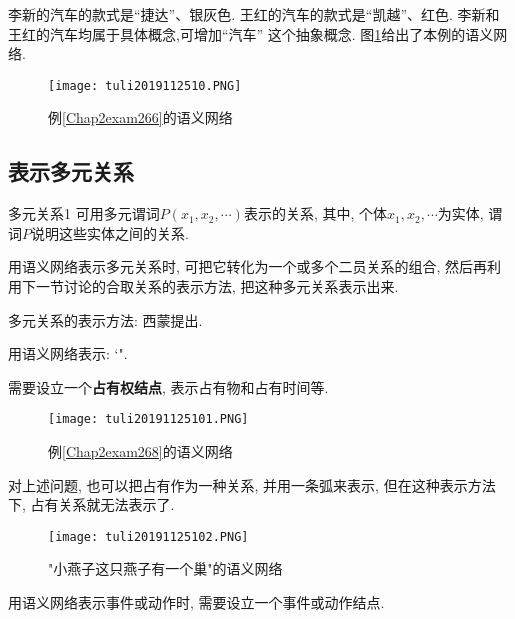 \begin{example}\label{Chap2exam266}
李新的汽车的款式是“捷达”、银灰色.
王红的汽车的款式是“凯越”、红色.
李新和王红的汽车均属于具体概念,可增加“汽车” 这个抽象概念.
图\ref{AI32fig10}给出了本例的语义网络.
\end{example}
\begin{figure}[htbp]
\centering
\texttt{[image: tuli2019112510.PNG]}
\caption{例\ref{Chap2exam266}的语义网络}
\label{AI32fig10}
\end{figure}
\subsection{表示多元关系}
\begin{mydef}{多元关系}{1}
可用多元谓词$P(x_1, x_2,\cdots)$表示的关系, 其中, 个体$x_1, x_2,\cdots$为实体, 谓词$P$说明这些实体之间的关系.
\end{mydef}

用语义网络表示多元关系时, 可把它转化为一个或多个二员关系的组合, 然后再利用下一节讨论的合取关系的表示方法, 把这种多元关系表示出来.

多元关系的表示方法: 西蒙提出.
\begin{example}\label{Chap2exam268}
用语义网络表示: `".
\end{example}
需要设立一个\textbf{占有权结点}, 表示占有物和占有时间等.
\begin{figure}[H]
\centering
\texttt{[image: tuli20191125101.PNG]}
\caption{例\ref{Chap2exam268}的语义网络}
\label{AI32fig101}
\end{figure}

对上述问题, 也可以把占有作为一种关系, 并用一条弧来表示, 但在这种表示方法下, 占有关系就无法表示了.
\begin{figure}[H]
\centering
\texttt{[image: tuli20191125102.PNG]}
\caption{"小燕子这只燕子有一个巢"的语义网络}
\label{AI32fig102}
\end{figure}
用语义网络表示事件或动作时, 需要设立一个事件或动作结点.

